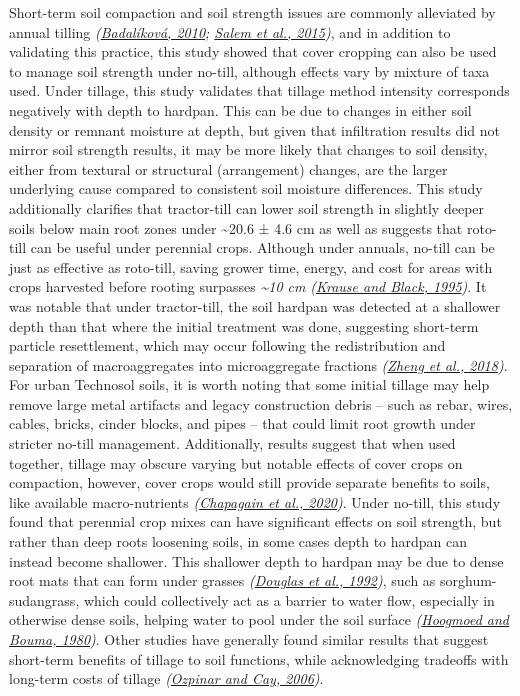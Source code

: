 \documentclass[
  12pt,
]{article}
\begin{document}
Short-term soil compaction and soil strength issues are commonly alleviated by annual tilling \emph{(\protect\hyperlink{ref-badalikova10}{Badalíková, 2010}; \protect\hyperlink{ref-salem15}{Salem et al., 2015})}, and in addition to validating this practice, this study showed that cover cropping can also be used to manage soil strength under no-till, although effects vary by mixture of taxa used.
Under tillage, this study validates that tillage method intensity corresponds negatively with depth to hardpan.
This can be due to changes in either soil density or remnant moisture at depth, but given that infiltration results did not mirror soil strength results, it may be more likely that changes to soil density, either from textural or structural (arrangement) changes, are the larger underlying cause compared to consistent soil moisture differences.
This study additionally clarifies that tractor-till can lower soil strength in slightly deeper soils below main root zones under
\textasciitilde20.6 ±
4.6 cm
as well as suggests that roto-till can be useful under perennial crops.
Although under annuals, no-till can be just as effective as roto-till, saving grower time, energy, and cost for areas with crops harvested before rooting surpasses \emph{\textasciitilde10 cm}
\emph{(\protect\hyperlink{ref-krause95}{Krause and Black, 1995})}.
It was notable that under tractor-till, the soil hardpan was detected at a shallower depth than that where the initial treatment was done, suggesting short-term particle resettlement, which may occur following the redistribution and separation of macroaggregates into microaggregate fractions \emph{(\protect\hyperlink{ref-zheng18}{Zheng et al., 2018})}.
For urban Technosol soils, it is worth noting that some initial tillage may help remove large metal artifacts and legacy construction debris -- such as rebar, wires, cables, bricks, cinder blocks, and pipes -- that could limit root growth under stricter no-till management.
Additionally, results suggest that when used together, tillage may obscure varying but notable effects of cover crops on compaction, however, cover crops would still provide separate benefits to soils, like available macro-nutrients \emph{(\protect\hyperlink{ref-chapagain20}{Chapagain et al., 2020})}.
Under no-till, this study found that perennial crop mixes can have significant effects on soil strength, but rather than deep roots loosening soils, in some cases depth to hardpan can instead become shallower.
This shallower depth to hardpan may be due to dense root mats that can form under grasses \emph{(\protect\hyperlink{ref-douglas92}{Douglas et al., 1992})}, such as sorghum-sudangrass, which could collectively act as a barrier to water flow, especially in otherwise dense soils, helping water to pool under the soil surface \emph{(\protect\hyperlink{ref-hoogmoed80}{Hoogmoed and Bouma, 1980})}.
Other studies have generally found similar results that suggest short-term benefits of tillage to soil functions, while acknowledging tradeoffs with long-term costs of tillage \emph{(\protect\hyperlink{ref-ozpinar06}{Ozpinar and Cay, 2006})}.
\end{document}

